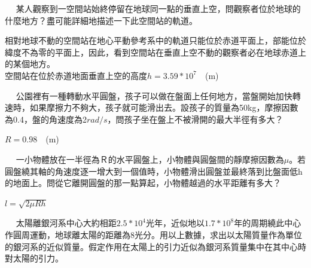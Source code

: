 \documentclass[cn,10pt,math=newtx,chinesefont=founder]{../elegantbook}
\begin{document}
\newpage


\begin{example}　
    某人觀察到一空間站始終停留在地球同一點的垂直上空，問觀察者位於地球的什麼地方？盡可能詳細地描述一下此空間站的軌道。
    
    \rightline{[2.1.15]}
\end{example}

\begin{solution}
相對地球不動的空間站在地心平動參考系中的軌道只能位於赤道平面上，部能位於緯度不為零的平面上，因此，看到空間站在垂直上空不動的觀察者必在地球赤道上的某個地方。\\
空間站在位於赤道地面垂直上空的高度$h = 3.59*10^7$　(m)
\end{solution}

\newpage


\begin{example}　
    公園裡有一種轉動水平圓盤，孩子可以做在盤面上任何地方，當盤開始加快轉速時，如果摩擦力不夠大，孩子就可能滑出去。設孩子的質量為50kg，摩擦因數為0.4，盤的角速度為2$rad/s$，問孩子坐在盤上不被滑開的最大半徑有多大？
    
    \rightline{[2.1.16]}
\end{example}

\begin{solution}
$R = 0.98$　(m)
\end{solution}

\newpage


\begin{example}　
    一小物體放在一半徑為Ｒ的水平圓盤上，小物體與圓盤間的靜摩擦因數為$\mu$。若圓盤繞其軸的角速度逐一增大到一個值時，小物體滑出圓盤並最終落到比盤面低h的地面上。問從它離開圓盤的那一點算起，小物體越過的水平距離有多大？
    
    \rightline{[2.1.17]}
\end{example}

\begin{solution}
$l = \sqrt{2\mu Rh}$
\end{solution}

\newpage


\begin{example}　
    太陽離銀河系中心大約相距$2.5*10^4$光年，近似地以$1.7*10^8$年的周期繞此中心作圓周運動，地球離太陽的距離為8光分。用以上數據，求出以太陽質量作為單位的銀河系的近似質量。假定作用在太陽上的引力近似為銀河系質量集中在其中心時對太陽的引力。
    
    \rightline{[2.1.18]}
\end{example}
\end{document}

